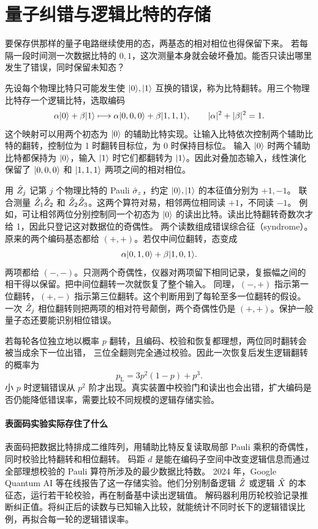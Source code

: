 \section{量子纠错与逻辑比特的存储}
\label{sec:qm-error-correction}
要保存供那样的量子电路继续使用的态，两基态的相对相位也得保留下来。
若每隔一段时间测一次数据比特的 $0,1$，这次测量本身就会破坏叠加。能否只读出哪里发生了错误，同时保留未知态？

先设每个物理比特只可能发生使 $\lvert0\rangle,\lvert1\rangle$ 互换的错误，称为比特翻转。用三个物理比特存一个逻辑比特，选取编码
\begin{equation}\label{eq:qm-bit-flip-code}
    \alpha\lvert0\rangle + \beta\lvert1\rangle
       \longmapsto \alpha\lvert0,0,0\rangle + \beta\lvert1,1,1\rangle,\qquad
       \lvert\alpha\rvert^2 + \lvert\beta\rvert^2 = 1 .
\end{equation}
这个映射可以用两个初态为 $\lvert0\rangle$ 的辅助比特实现。让输入比特依次控制两个辅助比特的翻转，控制位为 1 时翻转目标位，为 0 时保持目标位。
输入 $\lvert0\rangle$ 时两个辅助比特都保持为 $\lvert0\rangle$，输入 $\lvert1\rangle$ 时它们都翻转为 $\lvert1\rangle$。因此对叠加态输入，线性演化保留了 $\lvert0,0,0\rangle$ 和 $\lvert1,1,1\rangle$ 两项之间的相对相位。

用 $\hat{Z}_j$ 记第 $j$ 个物理比特的 Pauli $\hat{\sigma}_z$，约定 $\lvert0\rangle,\lvert1\rangle$ 的本征值分别为 $+1,-1$。
联合测量 $\hat{Z}_1\hat{Z}_2$ 和 $\hat{Z}_2\hat{Z}_3$。这两个算符对易，相邻两位相同读 $+1$，不同读 $-1$。
例如，可让相邻两位分别控制同一个初态为 $\lvert0\rangle$ 的读出比特。读出比特翻转奇数次才给 1，因此只登记这对数据位的奇偶性。
两个读数组成错误综合征（syndrome）。原来的两个编码基态都给 $(+,+)$。若仅中间位翻转，态变成
\[
    \alpha\lvert0,1,0\rangle + \beta\lvert1,0,1\rangle .
\]
两项都给 $(-,-)$。只测两个奇偶性，仪器对两项留下相同记录，复振幅之间的相干得以保留。把中间位翻转一次就恢复了整个输入。
同理，$(-,+)$ 指示第一位翻转，$(+,-)$ 指示第三位翻转。这个判断用到了每轮至多一位翻转的假设。
一次 $\hat{Z}_j$ 相位翻转则把两项的相对符号颠倒，两个奇偶性仍是 $(+,+)$。保护一般量子态还要能识别相位错误。

若每轮各位独立地以概率 $p$ 翻转，且编码、校验和恢复都理想，两位同时翻转会被当成余下一位出错，
三位全翻则完全通过校验。因此一次恢复后发生逻辑翻转的概率为
\[
    p_{\mathrm L} = 3p^2(1 - p) + p^3 .
\]
小 $p$ 时逻辑错误从 $p^2$ 阶才出现。真实装置中校验门和读出也会出错，扩大编码是否仍能降低错误率，需要比较不同规模的逻辑存储实验。

\paragraph{表面码实验实际存住了什么}
表面码把数据比特排成二维阵列，用辅助比特反复读取局部 Pauli 乘积的奇偶性，同时校验比特翻转和相位翻转。
码距 $d$ 是能在编码子空间中改变逻辑信息而通过全部理想校验的 Pauli 算符所涉及的最少数据比特数。
2024 年，\label{exp:qm-surface-memory}Google Quantum AI 等在线报告了这一存储实验\cite{surface-memory}。他们分别制备逻辑 $\hat{Z}$ 或逻辑 $\hat{X}$ 的本征态，运行若干轮校验，再在制备基中读出逻辑值。
解码器利用历轮校验记录推断纠正值。将纠正后的读数与已知输入比较，就能统计不同时长下的逻辑错误比例，再拟合每一轮的逻辑错误率。

